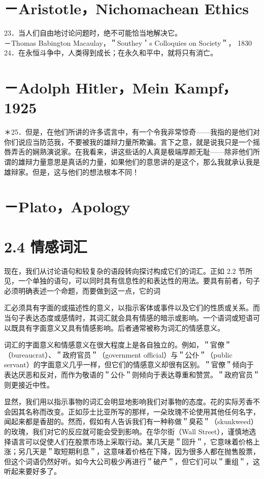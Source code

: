 \section*{－Aristotle，Nichomachean Ethics}
23．当人们自由地讨论问题时，绝不可能恰当地解决它。\\
－Thomas Babington Macaulay，＂Southey＇s Colloquies on Society＂， 1830\\
24．在永恒斗争中，人类得到成长；在永久和平中，就将只有消亡。

\section*{－Adolph Hitler，Mein Kampf， 1925}
＊25．但是，在他们所讲的许多谎言中，有一个令我非常惊奇——我指的是他们对你们说应当防范我，不要被我的雄辩力量所欺骗。言下之意，就是说我只是一个摇唇弄舌的娴熟演说家。在我看来，讲这些话的人真是极端厚颜无耻——除非他们所谓的雄辩力量意思是真话的力量，如果他们的意思讲的是这个，那么我就承认我是雄辩家。但是，这与他们的想法根本不同！

\section*{－Plato，Apology}
\section*{2.4 情感词汇}
现在，我们从讨论语句和较复杂的语段转向探讨构成它们的词汇。正如 2.2 节所见，一个单独的语句，可以同时具有信息性的和表达性的用法。要具有前者，句子必须明确表述一个命题，而要做到这一点，它的词

汇必须具有字面的或描述性的意义，以指示客体或事件以及它们的性质或关系。而当句子表达态度或感情时，其词汇就会具有情感的暗示或影响。一个语词或短语可以既具有字面意义又具有情感影响。后者通常被称为词汇的情感意义。

词汇的字面意义和情感意义在很大程度上是各自独立的。例如，＂官僚＂（bureaucrat）、＂政府官员＂（government official）与＂公仆＂（public servant）的字面意义几乎一样，但它们的情感意义却很有区别。＂官僚＂倾向于表达厌恶和反对，而作为敬语的＂公仆＂则倾向于表达尊重和赞赏。＂政府官员＂则更接近中性。

显然，我们用以指示事物的词汇会明显地影响我们对事物的态度。花的实际芳香不会因其名称而改变。正如莎士比亚所写的那样，一朵玫瑰不论使用其他任何名字，闻起来都是香甜的。然而，假如有人告诉我们有一种称做＂臭菘＂（skunkweed）的玫瑰，我们对它的反应就可能会受到影响。在华尔街（Wall Street），谨慎地选择语言可以促使人们在股票市场上采取行动。某几天是＂回升＂，它意味着价格上涨；另几天是＂取短期利息＂，这意味着价格在下降，因为很多人都在抛售股票，但这个词语仍然好听。如今大公司极少再进行＂破产＂，但它们可以＂重组＂，这听起来要好多了。

